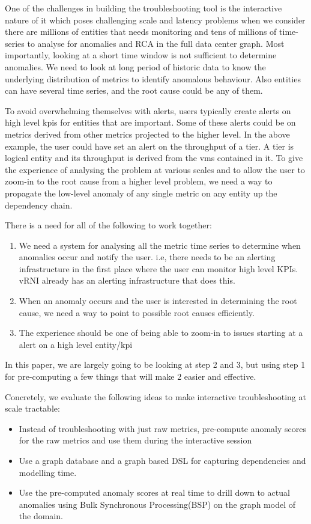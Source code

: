 \documentclass[times, twoside, watermark]{zHenriquesLab-StyleBioRxiv}
\begin{document}
One of the challenges in building the troubleshooting tool is the interactive nature of it which poses challenging scale and latency problems when we consider there are millions of entities that needs monitoring and tens of millions of time-series to analyse for anomalies and RCA in the full data center graph. Most importantly, looking at a short time window is not sufficient to determine anomalies. We need to look at long period of historic data to know the underlying distribution of metrics to identify anomalous behaviour. Also entities can have several time series, and the root cause could be any of them. 

To avoid overwhelming themselves with alerts, users typically create alerts on high level kpis for entities that are important. Some of these alerts could be on metrics derived from other metrics projected to the higher level. In the above example, the user could have set an alert on the throughput of a tier. A tier is logical entity and its throughput is derived from the vms contained in it. To give the experience of analysing the problem at various scales and to allow the user to zoom-in to the root cause from a higher level problem, we need a way to propagate the low-level anomaly of any single metric on any entity up the dependency chain.

There is a need for all of the following to work together:

\begin{enumerate}
  \item We need a system for analysing all the metric time series to determine when anomalies occur and notify the user. i.e, there needs to be an alerting infrastructure in the first place where the user can monitor high level KPIs. vRNI already has an alerting infrastructure that does this.
  \item When an anomaly occurs and the user is interested in determining the root cause, we need a way to point to possible root causes efficiently.
  \item The experience should be one of being able to zoom-in to issues starting at a alert on a high level entity/kpi
\end{enumerate}
In this paper, we are largely going to be looking at step 2 and 3, but using step 1 for pre-computing a few things that will make 2 easier and effective.

Concretely, we evaluate the following ideas to make interactive troubleshooting at scale tractable:
\begin{itemize}[noitemsep]
  \item Instead of troubleshooting with just raw metrics, pre-compute anomaly scores for the raw metrics and use them during the interactive session
  \item Use a graph database and a graph based DSL for capturing dependencies and modelling time.
  \item Use the pre-computed anomaly scores at real time to drill down to actual anomalies using Bulk Synchronous Processing(BSP)\cite{BSP} on the graph model of the domain.	
\end{itemize}
\end{document}
